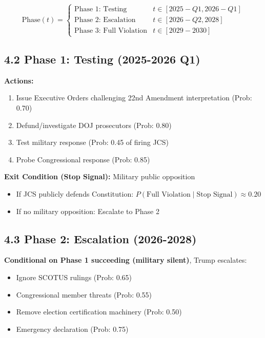 \documentclass[11pt]{article}
\begin{document}
\begin{equation}
\text{Phase}(t) = \begin{cases}
\text{Phase 1: Testing} & t \in [2025-Q1, 2026-Q1] \\
\text{Phase 2: Escalation} & t \in [2026-Q2, 2028] \\
\text{Phase 3: Full Violation} & t \in [2029-2030]
\end{cases}
\end{equation}

\subsection{4.2 Phase 1: Testing (2025-2026 Q1)}

\textbf{Actions:}
\begin{enumerate}
\item Issue Executive Orders challenging 22nd Amendment interpretation (Prob: 0.70)
\item Defund/investigate DOJ prosecutors (Prob: 0.80)
\item Test military response (Prob: 0.45 of firing JCS)
\item Probe Congressional response (Prob: 0.85)
\end{enumerate}

\textbf{Exit Condition (Stop Signal):} Military public opposition
\begin{itemize}
\item If JCS publicly defends Constitution: $P(\text{Full Violation} \mid \text{Stop Signal}) \approx 0.20$
\item If no military opposition: Escalate to Phase 2
\end{itemize}

\subsection{4.3 Phase 2: Escalation (2026-2028)}

\textbf{Conditional on Phase 1 succeeding (military silent)}, Trump escalates:

\begin{itemize}
\item Ignore SCOTUS rulings (Prob: 0.65)
\item Congressional member threats (Prob: 0.55)
\item Remove election certification machinery (Prob: 0.50)
\item Emergency declaration (Prob: 0.75)
\end{itemize}
\end{document}
